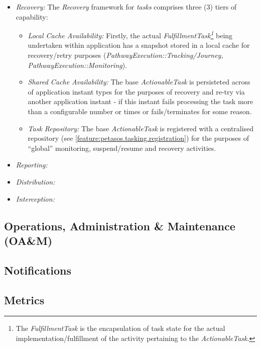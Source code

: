 \documentclass[a4paper]{book}
\begin{document}
\begin{itemize}
\begin{itemize}
            \item \textit{Recovery:} The \textit{Recovery} framework for \textit{tasks} comprises three (3) tiers of capability:
            \begin{itemize}
                \item \textit{Local Cache Availability:} Firstly, the actual \textit{FulfillmentTask\footnote{The \textit{FulfillmentTask} is the encapsulation of task state for the actual implementation/fulfillment of the activity pertaining to the \textit{ActionableTask}.}} being undertaken within application has a snapshot stored in a local cache for recovery/retry purposes (\textit{PathwayExecution::Tracking/Journey, PathwayExecution::Monitoring}).
                \item \textit{Shared Cache Availability:} The base \textit{ActionableTask} is persisteted across of application instant types for the purposes of recovery and re-try via another application instant - if this instant fails processing the task more than a configurable number or times or fails/terminates for some reason.
                \item \textit{Task Repository:} The base \textit{ActionableTask} is registered  with a centralised repository (see \ref{feature:petasos.tasking.registration}) for the purposes of ``global'' monitoring, suspend/resume and recovery activities.
            \end{itemize}
            \item \textit{Reporting:}
            \item \textit{Distribution:}
            \item \textit{Interception:}
        \end{itemize}
    \end{itemize}

\subsection{Operations, Administration \& Maintenance (OA\&M)}
\label{feature:petasos.oam}
\subsection{Notifications}
\label{feature:petasos.oam.notification}

\subsection{Metrics}
\label{feature:petasos.oam.metrics}
\end{document}
